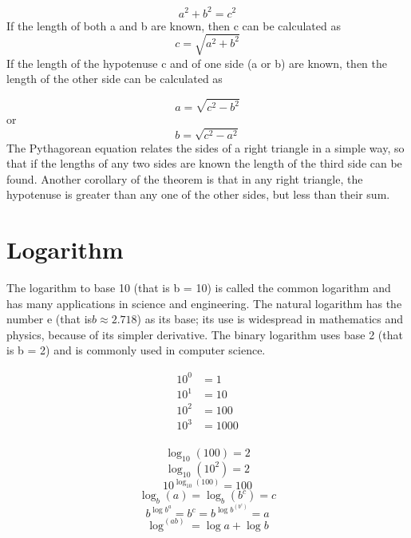 \begin{equation}
a^2 + b^2 = c^2
\end{equation}
If the length of both a and b are known, then c can be calculated as	
\begin{equation}
c = \sqrt{a^2+b^2}
\end{equation}
If the length of the hypotenuse c and of one side (a or b) are known, then the length of the other side can be calculated as

\begin{equation}
a = \sqrt{c^2-b^2}
\end{equation}
or
\begin{equation}
b = \sqrt{c^2-a^2}
\end{equation}
The Pythagorean equation relates the sides of a right triangle in a simple way, so that if the lengths of any two sides are known the length of the third side can be found. Another corollary of the theorem is that in any right triangle, the hypotenuse is greater than any one of the other sides, but less than their sum.

\section{Logarithm}
	The logarithm to base 10 (that is b = 10) is called the common logarithm and has many applications in science and engineering. The natural logarithm has the number e (that is$b  \approx 2.718$) as its base; its use is widespread in mathematics and physics, because of its simpler derivative. The binary logarithm uses base 2 (that is b = 2) and is commonly used in computer science.
	
	
	\begin{align*}
		10^0 &= 1 \\
		10^1 &= 10 \\
		10^2 &= 100 \\
		10^3 &= 1000 \\
	\end{align*}
	
	
	\begin{equation}
	\log_{10}(100) = 2
	\end{equation}
	\begin{equation}
	\log_{10}(10^2) = 2
	\end{equation}
	\begin{equation}
	10^{\log_{10}(100)} = 100
	\end{equation}
	\begin{equation}
	\log_{b} (a) = \log_{b} (b^c)= c
	\end{equation}
	\begin{equation}
	b^{\log b^a} = b^c = b^{\log b^{(b^c)}} = a
	\end{equation}
	\begin{equation}
	\log^{(ab)} = \log a +\log b
	\end{equation}
	
